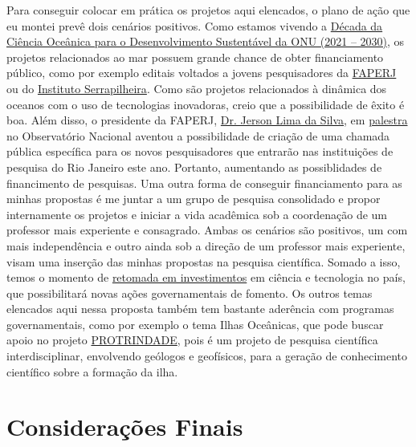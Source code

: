 \documentclass[10pt,a4paper,oneside]{book}
\begin{document}
Para conseguir colocar em prática os projetos aqui elencados, o plano de ação que eu montei prevê dois cenários positivos. Como estamos vivendo a \href{https://oceandecade.org/pt/}{Década da Ciência Oceânica para o Desenvolvimento Sustentável da ONU (2021 – 2030)}, os projetos relacionados ao mar possuem grande chance de obter financiamento público, como por exemplo editais voltados a jovens pesquisadores da \href{https://www.faperj.br/}{FAPERJ} ou do \href{https://serrapilheira.org/}{Instituto Serrapilheira}. Como são projetos relacionados à dinâmica dos oceanos com o uso de tecnologias inovadoras, creio que a possibilidade de êxito é boa. Além disso, o presidente da FAPERJ, \href{http://lattes.cnpq.br/3010441499735789}{Dr. Jerson Lima da Silva}, em \href{https://www.gov.br/observatorio/pt-br/assuntos/noticias/presidente-da-faperj-ministrara-aula-inaugural-do-1o-semestre-letivo-de-2024-dos-programas-de-pos-graduacao-do-on}{palestra} no Observatório Nacional aventou a possibilidade de criação de uma chamada pública específica para os novos pesquisadores que entrarão nas instituições de pesquisa do Rio Janeiro este ano. Portanto, aumentando as possiblidades de financimento de pesquisas. Uma outra forma de conseguir financiamento para as minhas propostas é me juntar a um grupo de pesquisa consolidado e propor internamente os projetos e iniciar a vida acadêmica sob a coordenação de um professor mais experiente e consagrado. Ambas os cenários são positivos, um com mais independência e outro ainda sob a direção de um professor mais experiente, visam uma inserção das minhas propostas na pesquisa científica. Somado a isso, temos o momento de \href{https://www.gov.br/mcti/pt-br/acompanhe-o-mcti/noticias/2023/12/mcti-executa-100-do-orcamento-do-fundo-nacional-de-desenvolvimento-cientifico-e-tecnologico-em-2023}{retomada em investimentos} em ciência e tecnologia no país, que possibilitará novas ações governamentais de fomento. Os outros temas elencados aqui nessa proposta também tem bastante aderência com programas governamentais, como por exemplo o tema Ilhas Oceânicas, que pode buscar apoio no projeto \href{https://adesgce.org/2022/03/17/marinha-do-brasil-e-programa-de-pesquisas-na-ilha-da-trindade-protrindade/}{PROTRINDADE}, pois é um projeto de pesquisa científica interdisciplinar, envolvendo geólogos e geofísicos, para a geração de conhecimento científico sobre a formação da ilha.


\chapter{Considerações Finais}
\label{cap_conclusao}
\end{document}
